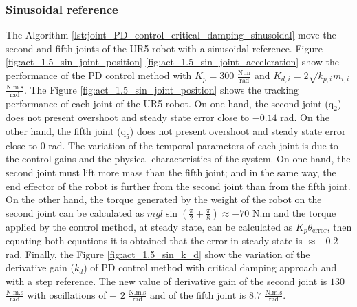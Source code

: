\subsubsection{Sinusoidal reference}
The Algorithm \ref{lst:joint_PD_control_critical_damping_sinusoidal} move the second and fifth joints of the UR5 robot with a sinusoidal reference. Figure \ref{fig:act_1.5_sin_joint_position}-\ref{fig:act_1.5_sin_joint_acceleration} show the performance of the PD control method with $K_p=300$ $\mathrm{\frac{N.m}{rad}}$ and $K_{d,i}=2 \sqrt{k_{p,i}} m_{i,i}$ $\mathrm{\frac{N.m.s}{rad}}$. The Figure \ref{fig:act_1.5_sin_joint_position} shows the tracking performance of each joint of the UR5 robot. On one hand, the second joint ($\mathrm{q}_2$) does not present overshoot and steady state error close to $-0.14$ rad. On the other hand, the fifth joint ($\mathrm{q}_5$) does not present overshoot and steady state error close to $0$ rad. The variation of the temporal parameters of each joint is due to the control gains and the physical characteristics of the system. On one hand, the second joint must lift more mass than the fifth joint; and in the same way, the end effector of the robot is further from the second joint than from the fifth joint. On the other hand, the torque generated by the weight of the robot on the second joint can be calculated as $m g l \sin({\frac{\pi}{2} + \frac{\pi}{8}}) \approx -70$ N.m and the torque applied by the control method, at steady state, can be calculated as $K_p \theta_{\mathrm{error}}$, then equating both equations it is obtained that the error in steady state is $\approx -0.2$ rad. Finally, the Figure \ref{fig:act_1.5_sin_k_d} show the variation of the derivative gain ($k_d$) of PD control method with critical damping approach and with a step reference. The new value of derivative gain of the second joint is $130$ $\mathrm{\frac{N.m.s}{rad}}$ with oscillations of $\pm$ $2$ $\mathrm{\frac{N.m.s}{rad}}$ and of the fifth joint is $8.7$ $\mathrm{\frac{N.m.s}{rad}}$.  

